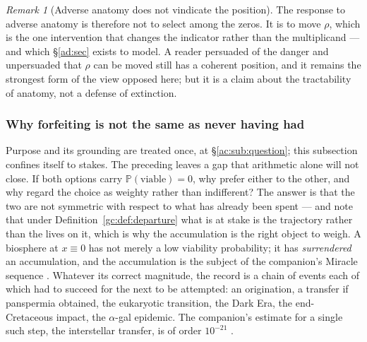 \documentclass[11pt]{article}
\numberwithin{equation}{section}
\theoremstyle{plain}
\theoremstyle{definition}
\theoremstyle{remark}
\newtheorem{remark}[theorem]{Remark}
\newcommand{\PP}{\mathbb{P}}
\begin{document}
\begin{remark}[Adverse anatomy does not vindicate the position]
The response to adverse anatomy is therefore not to select among the
zeros. It is to move $\rho$, which is the one intervention that changes
the indicator rather than the multiplicand --- and which
\S\ref{ad:sec} exists to model. A reader persuaded of the danger and
unpersuaded that $\rho$ can be moved still has a coherent position, and
it remains the strongest form of the view opposed here; but it is a
claim about the tractability of anatomy, not a defense of extinction.
\end{remark}

\subsubsection{Why forfeiting is not the same as never having had}
\label{hr:subsub:stakes}

\noindent Purpose and its grounding are treated once, at
\S\ref{ac:sub:question}; this subsection confines itself to stakes. The preceding leaves a gap that arithmetic alone will not close. If both
options carry $\PP(\text{viable})=0$, why prefer either to the other,
and why regard the choice as weighty rather than indifferent? The answer is that the two are not symmetric with respect to what has
already been spent --- and note that under
Definition~\ref{gc:def:departure} what is at stake is the trajectory
rather than the lives on it, which is why the accumulation is the right
object to weigh. A biosphere at $x\equiv0$ has not merely a low
viability probability; it has \emph{surrendered} an accumulation, and
the accumulation is the subject of the companion's Miracle sequence
\cite{Nexus}. Whatever its correct magnitude, the record is a chain of
events each of which had to succeed for the next to be attempted: an
origination, a transfer if panspermia obtained, the eukaryotic
transition, the Dark Era, the end-Cretaceous impact, the
$\alpha$-gal epidemic. The companion's estimate for a single such
step, the interstellar transfer, is of order $10^{-21}$
\cite{Nexus}.
\end{document}

